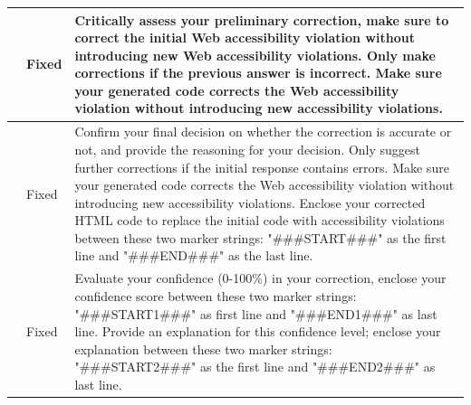 \documentclass[sigconf, nonacm]{acmart}
\begin{document}
\begin{table}
{\begin{tabular}{p{2.3cm}p{1cm}p{14cm}}
& Fixed &     Critically assess your preliminary correction, make sure to correct the initial Web accessibility violation without introducing new Web accessibility violations. Only make corrections if the previous answer is incorrect. Make sure your generated code corrects the Web accessibility violation without introducing new accessibility violations.\\ \hline

& Fixed &  Confirm your final decision on whether the correction is accurate or not, and provide the reasoning for your decision. Only suggest further corrections if the initial response contains errors. Make sure your generated code corrects the Web accessibility violation without introducing new accessibility violations. Enclose your corrected HTML code to replace the initial code with accessibility violations between these two marker strings: "\#\#\#START\#\#\#" as the first line and "\#\#\#END\#\#\#" as the last line.
  \\ \hline

& Fixed & Evaluate your confidence (0-100\%) in your correction, enclose your confidence score between these two marker strings: "\#\#\#START1\#\#\#" as first line and "\#\#\#END1\#\#\#" as last line. Provide an explanation for this confidence level; enclose your explanation between these two marker strings: "\#\#\#START2\#\#\#" as the first line and "\#\#\#END2\#\#\#" as last line.
     \\

\bottomrule
\end{tabular}}
\end{table}
\end{document}
